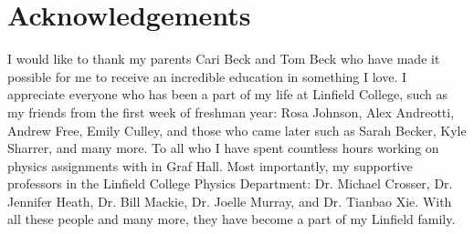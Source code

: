 \chapter{Acknowledgements}

I would like to thank my parents Cari Beck and Tom Beck who have made it possible for me to receive an incredible education in something I love. I appreciate everyone who has been a part of my life at Linfield College, such as my friends from the first week of freshman year: Rosa Johnson, Alex Andreotti, Andrew Free, Emily Culley, and those who came later such as Sarah Becker, Kyle Sharrer, and many more. To all who I have spent countless hours working on physics assignments with in Graf Hall. Most importantly, my supportive professors in the Linfield College Physics Department: Dr. Michael Crosser, Dr. Jennifer Heath, Dr. Bill Mackie, Dr. Joelle Murray, and Dr. Tianbao Xie. With all these people and many more, they have become a part of my Linfield family.